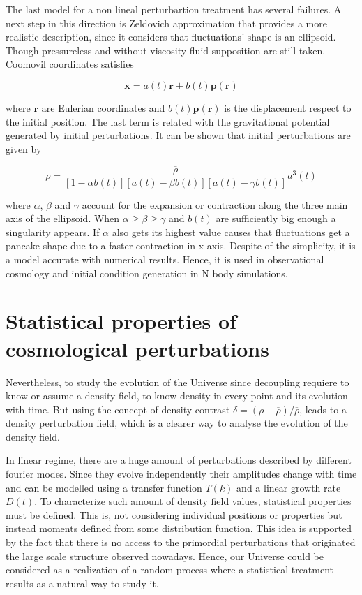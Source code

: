 The last model for a non lineal perturbartion treatment 
has several failures. A next step in this direction is 
Zeldovich approximation that provides a more realistic description, 
since it considers that fluctuations' shape is an ellipsoid.
Though pressureless and without viscosity fluid supposition are still taken.
Coomovil coordinates satisfies 

\[
\textbf{x} = a(t)\textbf{r}+b(t)\textbf{p}(\textbf{r})
\]

where $\textbf{r}$ are Eulerian coordinates and $b(t)\textbf{p}(\textbf{r})$
is the displacement respect to the initial position. The last term is related 
with the gravitational potential generated by initial perturbations. 
It can be shown that initial perturbations are given by 

\[
\rho = \frac{\overline{\rho} }{[1-\alpha b(t)][a(t)-\beta b(t)][a(t)-\gamma b(t)]}a^3(t)
\]

where $\alpha$, $\beta$ and $\gamma$ account for the expansion or contraction 
along the three main axis of the ellipsoid. 
When  $\alpha \geq \beta \geq \gamma$ and $b(t)$ are sufficiently big enough a 
singularity appears. If $\alpha$ also gets its highest value causes that fluctuations
get a pancake shape due to a faster contraction in x axis. 
Despite of the simplicity, it is a model accurate with numerical results. Hence,
it is used in observational cosmology and initial condition generation in N body
simulations. 

\section{ Statistical properties of cosmological perturbations }

Nevertheless, to study the evolution of the Universe since decoupling requiere to know 
or assume a density field, to know density in every point and its evolution with time. 
But using the concept of density contrast $\delta = (\rho - \overline{\rho})/\overline{\rho}$, 
leads to a density perturbation field, which is a clearer way to analyse the evolution
of the density field.

In linear regime, there are a huge amount of perturbations described by different 
fourier modes. Since they evolve independently their amplitudes change with time and 
can be modelled using a transfer function $T(k)$ and a linear growth rate $D(t)$. 
To characterize such amount of density field values, statistical 
properties must be defined. 
This is, not considering individual positions or properties but instead moments defined from
some distribution function. This idea is supported by the fact that there is no access 
to the primordial perturbations that originated the large scale structure observed 
nowadays. Hence, our Universe could be considered as a realization of a random process 
where a statistical treatment results as a natural way to study it. 

